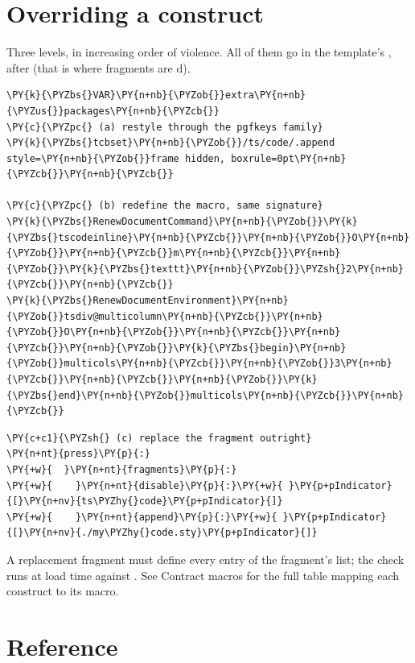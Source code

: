 \documentclass[a4paper,twoside]{article}
\begin{document}
\section{Overriding a construct}
Three levels, in increasing order of violence. All of them go in the template's
, after  (that is where fragments are
d).
\begin{tscode}[lang=latex, engine=pygments]
\begin{Verbatim}[commandchars=\\\{\},breaklines, breakanywhere, commandchars=\\\{\}]
\PY{k}{\PYZbs{}VAR}\PY{n+nb}{\PYZob{}}extra\PY{n+nb}{\PYZus{}}packages\PY{n+nb}{\PYZcb{}}
\PY{c}{\PYZpc{} (a) restyle through the pgfkeys family}
\PY{k}{\PYZbs{}tcbset}\PY{n+nb}{\PYZob{}}/ts/code/.append style=\PY{n+nb}{\PYZob{}}frame hidden, boxrule=0pt\PY{n+nb}{\PYZcb{}}\PY{n+nb}{\PYZcb{}}

\PY{c}{\PYZpc{} (b) redefine the macro, same signature}
\PY{k}{\PYZbs{}RenewDocumentCommand}\PY{n+nb}{\PYZob{}}\PY{k}{\PYZbs{}tscodeinline}\PY{n+nb}{\PYZcb{}}\PY{n+nb}{\PYZob{}}O\PY{n+nb}{\PYZob{}}\PY{n+nb}{\PYZcb{}}m\PY{n+nb}{\PYZcb{}}\PY{n+nb}{\PYZob{}}\PY{k}{\PYZbs{}texttt}\PY{n+nb}{\PYZob{}}\PYZsh{}2\PY{n+nb}{\PYZcb{}}\PY{n+nb}{\PYZcb{}}
\PY{k}{\PYZbs{}RenewDocumentEnvironment}\PY{n+nb}{\PYZob{}}tsdiv@multicolumn\PY{n+nb}{\PYZcb{}}\PY{n+nb}{\PYZob{}}O\PY{n+nb}{\PYZob{}}\PY{n+nb}{\PYZcb{}}\PY{n+nb}{\PYZcb{}}\PY{n+nb}{\PYZob{}}\PY{k}{\PYZbs{}begin}\PY{n+nb}{\PYZob{}}multicols\PY{n+nb}{\PYZcb{}}\PY{n+nb}{\PYZob{}}3\PY{n+nb}{\PYZcb{}}\PY{n+nb}{\PYZcb{}}\PY{n+nb}{\PYZob{}}\PY{k}{\PYZbs{}end}\PY{n+nb}{\PYZob{}}multicols\PY{n+nb}{\PYZcb{}}\PY{n+nb}{\PYZcb{}}
\end{Verbatim}
\end{tscode}
\begin{tscode}[lang=yaml, engine=pygments]
\begin{Verbatim}[commandchars=\\\{\},breaklines, breakanywhere, commandchars=\\\{\}]
\PY{c+c1}{\PYZsh{} (c) replace the fragment outright}
\PY{n+nt}{press}\PY{p}{:}
\PY{+w}{  }\PY{n+nt}{fragments}\PY{p}{:}
\PY{+w}{    }\PY{n+nt}{disable}\PY{p}{:}\PY{+w}{ }\PY{p+pIndicator}{[}\PY{n+nv}{ts\PYZhy{}code}\PY{p+pIndicator}{]}
\PY{+w}{    }\PY{n+nt}{append}\PY{p}{:}\PY{+w}{ }\PY{p+pIndicator}{[}\PY{n+nv}{./my\PYZhy{}code.sty}\PY{p+pIndicator}{]}
\end{Verbatim}
\end{tscode}
A replacement fragment must define every entry of the fragment's 
list; the check runs at load time against . See
Contract macros for the full table mapping
each construct to its macro.
\section{Reference}
\end{document}
